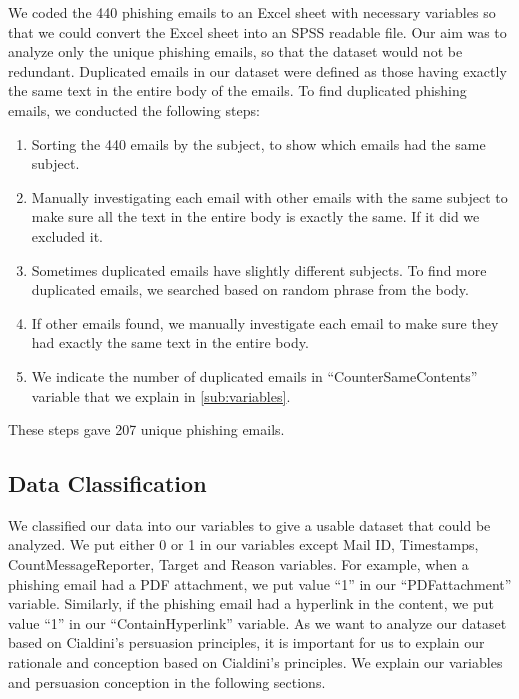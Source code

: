We coded the 440 phishing emails to an Excel sheet with necessary
variables so that we could convert the Excel sheet into an SPSS readable
file. Our aim was to analyze only the unique phishing emails, so that
the dataset would not be redundant. Duplicated emails in our dataset
were defined as those having exactly the same text in the entire body
of the emails. To find duplicated phishing emails, we conducted the
following steps:
\begin{enumerate}
\item Sorting the 440 emails by the subject, to show which emails had the
same subject.
\item Manually investigating each email with other emails with the same
subject to make sure all the text in the entire body is exactly the
same. If it did we excluded it.
\item Sometimes duplicated emails have slightly different subjects. To find
more duplicated emails, we searched based on random phrase from the
body.
\item If other emails found, we manually investigate each email to make
sure they had exactly the same text in the entire body.
\item We indicate the number of duplicated emails in ``CounterSameContents''
variable that we explain in \autoref{sub:variables}.
\end{enumerate}
These steps gave 207 unique phishing emails.


\subsection{Data Classification}

We classified our data into our variables to give a usable dataset
that could be analyzed. We put either 0 or 1 in our variables except
Mail ID, Timestamps, CountMessageReporter, Target and Reason variables.
For example, when a phishing email had a PDF attachment, we put value
\textquotedblleft 1\textquotedblright{} in our \textquotedblleft PDFattachment\textquotedblright{}
variable. Similarly, if the phishing email had a hyperlink in the
content, we put value \textquotedblleft 1\textquotedblright{} in our
\textquotedblleft ContainHyperlink\textquotedblright{} variable. As
we want to analyze our dataset based on Cialdini\textquoteright s
persuasion principles, it is important for us to explain our rationale
and conception based on Cialdini\textquoteright s principles. We explain
our variables and persuasion conception in the following sections.


